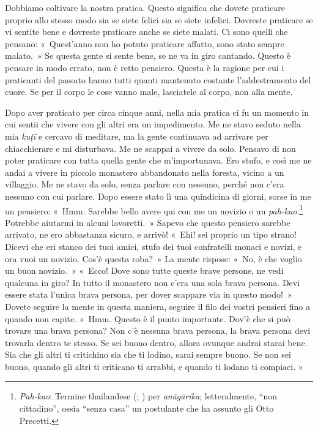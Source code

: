 Dobbiamo coltivare la nostra pratica. Questo significa che dovete
praticare proprio allo stesso modo sia se siete felici sia se siete
infelici. Dovreste praticare se vi sentite bene e dovreste praticare
anche se siete malati. Ci sono quelli che pensano: «~Quest'anno non ho
potuto praticare affatto, sono stato sempre malato.~» Se questa gente si
sente bene, se ne va in giro cantando. Questo è pensare in modo errato,
non è retto pensiero. Questa è la ragione per cui i praticanti del
passato hanno tutti quanti mantenuto costante l'addestramento del cuore.
Se per il corpo le cose vanno male, lasciatele al corpo, non alla mente.

Dopo aver praticato per circa cinque anni, nella mia pratica ci fu un
momento in cui sentii che vivere con gli altri era un impedimento. Me ne
stavo seduto nella mia \emph{kuṭī} e cercavo di meditare, ma la gente
continuava ad arrivare per chiacchierare e mi disturbava. Me ne scappai
a vivere da solo. Pensavo di non poter praticare con tutta quella gente
che m'importunava. Ero stufo, e così me ne andai a vivere in piccolo
monastero abbandonato nella foresta, vicino a un villaggio. Me ne stavo
da solo, senza parlare con nessuno, perché non c'era nessuno con cui
parlare. Dopo essere stato lì una quindicina di giorni, sorse in me un
pensiero: «~Hmm. Sarebbe bello avere qui con me un novizio o un
\emph{pah-kao}.\footnote{\emph{Pah-kao}: Termine thailandese (;
  ) per \emph{anāgārika}; letteralmente, ``non cittadino'', ossia
  ``senza casa'' un postulante che ha assunto gli Otto Precetti.}
Potrebbe aiutarmi in alcuni lavoretti.~» Sapevo che questo pensiero
sarebbe arrivato, ne ero abbastanza sicuro, e arrivò! «~Ehi! sei proprio
un tipo strano! Dicevi che eri stanco dei tuoi amici, stufo dei tuoi
confratelli monaci e novizi, e ora vuoi un novizio. Cos'è questa roba?~»
La mente rispose: «~No, è che voglio un buon novizio.~» «~Ecco! Dove
sono tutte queste brave persone, ne vedi qualcuna in giro? In tutto il
monastero non c'era una sola brava persona. Devi essere stata l'unica
brava persona, per dover scappare via in questo modo!~» Dovete seguire
la mente in questa maniera, seguire il filo dei vostri pensieri fino a
quando non capite. «~Hmm. Questo è il punto importante. Dov'è che si può
trovare una brava persona? Non c'è nessuna brava persona, la brava
persona devi trovarla dentro te stesso. Se sei buono dentro, allora
ovunque andrai starai bene. Sia che gli altri ti critichino sia che ti
lodino, sarai sempre buono. Se non sei buono, quando gli altri ti
criticano ti arrabbi, e quando ti lodano ti compiaci. »

